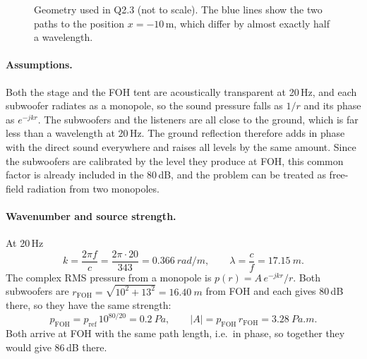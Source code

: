 \documentclass[11pt,a4paper]{article}
\begin{document}
\begin{figure}[htbp]
\centering
{}
\caption{Geometry used in Q2.3 (not to scale). The blue lines show the two
paths to the position $x = -10$\,m, which differ by almost exactly half a
wavelength.}
\label{fig:geometry}
\end{figure}

\paragraph{Assumptions.} Both the stage and the FOH tent are acoustically
transparent at 20\,Hz, and each subwoofer radiates as a monopole, so the
sound pressure falls as $1/r$ and its phase as $e^{-jkr}$. The subwoofers
and the listeners are all close to the ground, which is far less than a
wavelength at 20\,Hz. The ground reflection therefore adds in phase with the
direct sound everywhere and raises all levels by the same amount. Since the
subwoofers are calibrated by the level they produce at FOH, this common
factor is already included in the 80\,dB, and the problem can be treated as
free-field radiation from two monopoles.

\paragraph{Wavenumber and source strength.} At 20\,Hz
\begin{equation}
  k = \frac{2\pi f}{c} = \frac{2\pi\cdot 20}{343} = \SI{0.366}{rad/m},
  \qquad \lambda = \frac{c}{f} = \SI{17.15}{m}.
\end{equation}
The complex RMS pressure from a monopole is $p(r) = A\,e^{-jkr}/r$. Both
subwoofers are $r_\text{FOH} = \sqrt{10^2+13^2} = \SI{16.40}{m}$ from FOH and
each gives 80\,dB there, so they have the same strength:
\begin{equation}
  p_\text{FOH} = p_\text{ref}\,10^{80/20} = \SI{0.2}{Pa},\qquad
  |A| = p_\text{FOH}\,r_\text{FOH} = \SI{3.28}{Pa.m}.
\end{equation}
Both arrive at FOH with the same path length, i.e.\ in phase, so together
they would give 86\,dB there.
\end{document}
